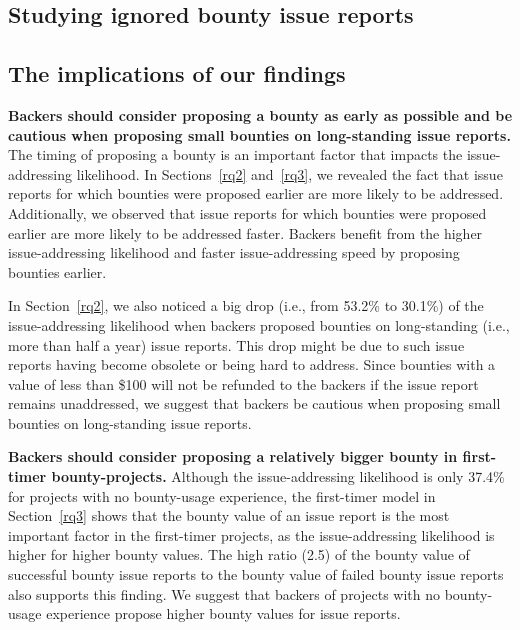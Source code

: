\subsection{Studying ignored bounty issue reports}
\label{rq4}


\subsection{The implications of our findings}
\textbf{Backers should consider proposing a bounty as early as possible and be cautious when proposing small bounties on long-standing issue reports.}
The timing of proposing a bounty is an important factor that impacts the issue-addressing likelihood. In Sections~\ref{rq2} and~\ref{rq3}, we revealed the fact that issue reports for which bounties were proposed earlier are more likely to be addressed. Additionally, we observed that issue reports for which bounties were proposed earlier are more likely to be addressed faster. Backers benefit from the higher issue-addressing likelihood and faster issue-addressing speed by proposing bounties earlier.

In Section~\ref{rq2}, we also noticed a big drop (i.e., from 53.2\% to 30.1\%) of the issue-addressing likelihood when backers proposed bounties on long-standing (i.e., more than half a year) issue reports. This drop might be due to such issue reports having become obsolete or being hard to address.
Since bounties with a value of less than \$100 will not be refunded to the backers if the issue report remains unaddressed, we suggest that backers be cautious when proposing small bounties on long-standing issue reports.

\textbf{Backers should consider proposing a relatively bigger bounty in first-timer bounty-projects.} %
Although the issue-addressing likelihood is only 37.4\%  for projects with no bounty-usage experience, the first-timer model in Section~\ref{rq3} shows that the bounty value of an issue report is the most important factor in the first-timer projects, as the issue-addressing likelihood is higher for higher bounty values. The high ratio (2.5) of the bounty value of successful bounty issue reports to the bounty value of failed bounty issue reports also supports this finding.
We suggest that backers of projects with no bounty-usage experience propose higher bounty values for issue reports.



